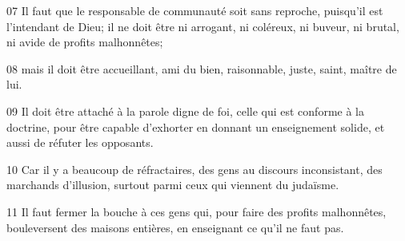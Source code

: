 07 Il faut que le responsable de communauté soit sans reproche, puisqu’il est l’intendant de Dieu; il ne doit être ni arrogant, ni coléreux, ni buveur, ni brutal, ni avide de profits malhonnêtes;

08 mais il doit être accueillant, ami du bien, raisonnable, juste, saint, maître de lui.

09 Il doit être attaché à la parole digne de foi, celle qui est conforme à la doctrine, pour être capable d’exhorter en donnant un enseignement solide, et aussi de réfuter les opposants.

10 Car il y a beaucoup de réfractaires, des gens au discours inconsistant, des marchands d’illusion, surtout parmi ceux qui viennent du judaïsme.

11 Il faut fermer la bouche à ces gens qui, pour faire des profits malhonnêtes, bouleversent des maisons entières, en enseignant ce qu’il ne faut pas.